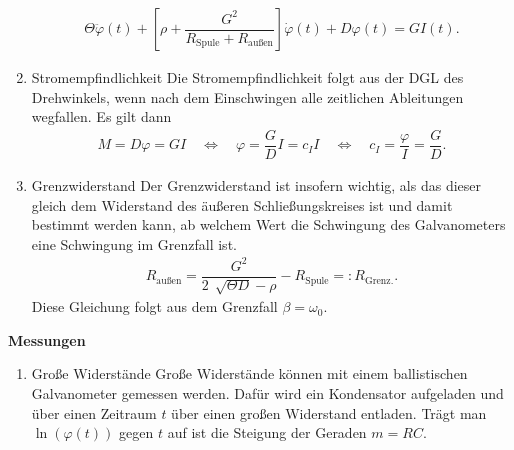 \begin{enumerate}[label=--]
\begin{align}
                        \Theta \ddot{\varphi }\left(t\right)+\left[\rho +\dfrac{G^2}{R_\text{Spule}+R_\text{außen}}\right]\dot{\varphi }\left(t\right)+D\varphi \left(t\right)=GI\left(t\right)
                .\end{align} 
        \item Stromempfindlichkeit \hspace{25pt}
                Die Stromempfindlichkeit folgt aus der DGL des Drehwinkels, wenn nach dem Einschwingen alle zeitlichen Ableitungen wegfallen. 
                Es gilt dann
                \begin{align} 
                        M=D\varphi =GI\quad \Leftrightarrow \quad \varphi =\dfrac{G}{D}I=c_II\quad \Leftrightarrow \quad c_I=\dfrac{\varphi }{I}=\dfrac{G}{D}
                .\end{align} 
        \item Grenzwiderstand \hspace{25pt}
                Der Grenzwiderstand ist insofern wichtig, als das dieser gleich dem Widerstand des äußeren Schließungskreises ist und damit bestimmt werden kann, ab welchem Wert die Schwingung des Galvanometers eine Schwingung im Grenzfall ist.
                \begin{align} 
                        R_\text{außen}=\dfrac{G^2}{2\,\sqrt[]{\Theta D}-\rho }-R_\text{Spule}=:R_\text{Grenz.}
                .\end{align} 
                Diese Gleichung folgt aus dem Grenzfall $\beta =\omega _0$. 
\end{enumerate}
\textbf{Messungen} 
\begin{enumerate}[label=--]
        \item Große Widerstände \hspace{25pt}
                Große Widerstände können mit einem ballistischen Galvanometer gemessen werden.
                Dafür wird ein Kondensator aufgeladen und über einen Zeitraum $t$ über einen großen Widerstand entladen.
                Trägt man $\ln\left(\varphi \left(t\right)\right)$ gegen $t$ auf ist die Steigung der Geraden $m=RC$.
\end{enumerate}

\newpage
